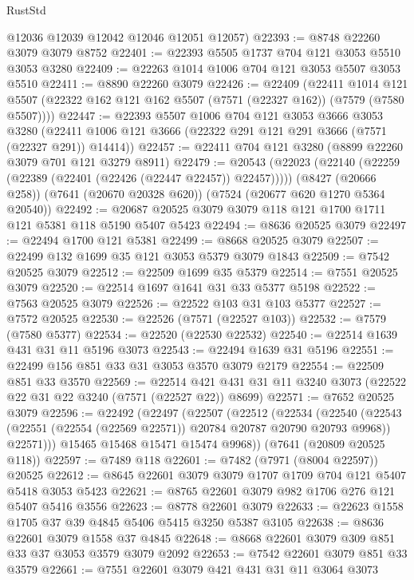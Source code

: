 \begin{lexlean}{RustStd}
\begin{coremodule}
{\begin{coremodule}
{{{{{{{{{{{{{{{{{{{{{{{{{{{{{{{{      @12036
      @12039
      @12042
      @12046
      @12051
      @12057)
@22393 := @8748 @22260 @3079 @3079 @8752
@22401 := @22393 @5505 @1737 @704 @121 @3053 @5510 @3053 @3280
@22409 := @22263 @1014 @1006 @704 @121 @3053 @5507 @3053 @5510
@22411 := @8890 @22260 @3079
@22426 := @22409
    (@22411
      @1014
      @121
      @5507
      (@22322 @162 @121 @162 @5507 (@7571 (@22327 @162)) (@7579 (@7580 @5507))))
@22447 := @22393
    @5507
    @1006
    @704
    @121
    @3053
    @3666
    @3053
    @3280
    (@22411 @1006 @121 @3666 (@22322 @291 @121 @291 @3666 (@7571 (@22327 @291)) @14414))
@22457 := @22411 @704 @121 @3280 (@8899 @22260 @3079 @701 @121 @3279 @8911)
@22479 := @20543
    (@22023 (@22140 (@22259 (@22389 (@22401 (@22426 (@22447 @22457)) @22457)))))
    (@8427 (@20666 @258))
    (@7641 (@20670 @20328 @620))
    (@7524 (@20677 @620 @1270 @5364 @20540))
@22492 := @20687 @20525 @3079 @3079 @118 @121 @1700 @1711 @121 @5381 @118 @5190 @5407 @5423
@22494 := @8636 @20525 @3079
@22497 := @22494 @1700 @121 @5381
@22499 := @8668 @20525 @3079
@22507 := @22499 @132 @1699 @35 @121 @3053 @5379 @3079 @1843
@22509 := @7542 @20525 @3079
@22512 := @22509 @1699 @35 @5379
@22514 := @7551 @20525 @3079
@22520 := @22514 @1697 @1641 @31 @33 @5377 @5198
@22522 := @7563 @20525 @3079
@22526 := @22522 @103 @31 @103 @5377
@22527 := @7572 @20525
@22530 := @22526 (@7571 (@22527 @103))
@22532 := @7579 (@7580 @5377)
@22534 := @22520 (@22530 @22532)
@22540 := @22514 @1639 @431 @31 @11 @5196 @3073
@22543 := @22494 @1639 @31 @5196
@22551 := @22499 @156 @851 @33 @31 @3053 @3570 @3079 @2179
@22554 := @22509 @851 @33 @3570
@22569 := @22514 @421 @431 @31 @11 @3240 @3073 (@22522 @22 @31 @22 @3240 (@7571 (@22527 @22)) @8699)
@22571 := @7652 @20525 @3079
@22596 := @22492
    (@22497
      (@22507
        (@22512
          (@22534
            (@22540
              (@22543 (@22551 (@22554 (@22569 @22571)) @20784 @20787 @20790 @20793 @9968))
              @22571)))
        @15465
        @15468
        @15471
        @15474
        @9968))
    (@7641 (@20809 @20525 @118))
@22597 := @7489 @118
@22601 := @7482 (@7971 (@8004 @22597)) @20525
@22612 := @8645 @22601 @3079 @3079 @1707 @1709 @704 @121 @5407 @5418 @3053 @5423
@22621 := @8765 @22601 @3079 @982 @1706 @276 @121 @5407 @5416 @3556
@22623 := @8778 @22601 @3079
@22633 := @22623 @1558 @1705 @37 @39 @4845 @5406 @5415 @3250 @5387 @3105
@22638 := @8636 @22601 @3079 @1558 @37 @4845
@22648 := @8668 @22601 @3079 @309 @851 @33 @37 @3053 @3579 @3079 @2092
@22653 := @7542 @22601 @3079 @851 @33 @3579
@22661 := @7551 @22601 @3079 @421 @431 @31 @11 @3064 @3073
}}}}}}}}}}}}}}}}}}}}}}}}}}}}}}}}
\end{coremodule}}
\end{coremodule}
\end{lexlean}
